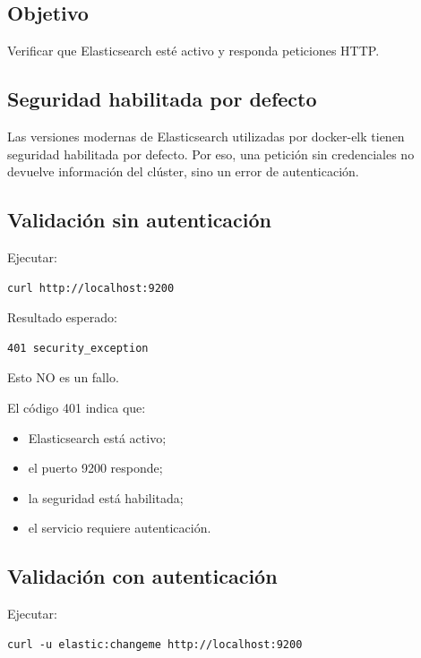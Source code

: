 \documentclass[
  coursetitle={Cómputo Nube y Tecnologías Emergentes},
  coursehours={96},
  coursedate={Verano 2026},
  doctype={Práctica},
  otherlangs={english,french},
  authorname={Lázaro},
  authorsurname={Bustio-Martínez},
  authortitle={PhD},
  role={Profesor Investigador},
  email={lbustio@inaoe.mx},
  phone={5559504000},
  ext={7459},
  institution={Instituto Nacional de Astrofísica, Óptica y Electrónica (INAOE)},
  department={Maestría en Ciencias en Tecnologías de Seguridad},
  address={Luis Enrique Erro 1, Sta. Ma. Tonantzintla, San Andrés Cholula, CP 72840, Puebla, México},
  margin={0.5in}
]{../../lbustio_lecture_notes}
\begin{document}
\subsection{Objetivo}

Verificar que Elasticsearch esté activo y responda peticiones HTTP.

\subsection{Seguridad habilitada por defecto}

Las versiones modernas de Elasticsearch utilizadas por docker-elk tienen seguridad habilitada por defecto. Por eso, una petición sin credenciales no devuelve información del clúster, sino un error de autenticación.

\subsection{Validación sin autenticación}

Ejecutar:

\begin{lstlisting}
curl http://localhost:9200
\end{lstlisting}

Resultado esperado:

\begin{verbatim}
401 security_exception
\end{verbatim}

Esto NO es un fallo.

El código 401 indica que:

\begin{itemize}
    \item Elasticsearch está activo;
    \item el puerto 9200 responde;
    \item la seguridad está habilitada;
    \item el servicio requiere autenticación.
\end{itemize}

\subsection{Validación con autenticación}

Ejecutar:

\begin{lstlisting}
curl -u elastic:changeme http://localhost:9200
\end{lstlisting}
\end{document}
